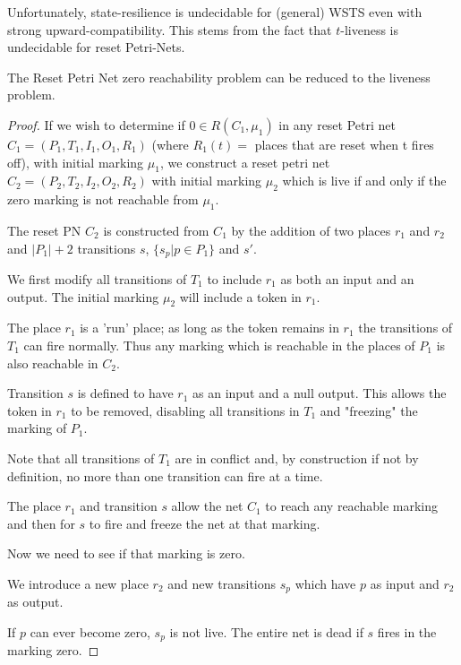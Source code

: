 Unfortunately, state-resilience is undecidable for (general) WSTS even with strong upward-compatibility.
This stems from the fact that $t$-liveness is undecidable for reset Petri-Nets.


\begin{theorem}\label{liveness reset}
The  Reset Petri Net zero reachability problem can be reduced to the liveness problem.
\end{theorem}

\iffalse
\begin{proof}
If we wish to determine if $0 \in R(C_1, \mu_1)$ in any
reset Petri net $C_1 = (P_1, T_1, I_1, O_1, R_1 )$ (where $R_1(t) =$ places that are reset when t fires off), with initial marking $\mu_1$, we construct a
reset petri net $C_2 = (P_2, T_2, I_2, O_2, R_2 )$ with initial marking
$\mu_2$ which is live if and only if the zero marking is not reachable from $\mu_1$.

The reset PN $C_2$ is constructed from $C_1$ by the addition of two places $r_1$ and $r_2$
and $|P_1| +2$ transitions $s$, $\{ s_p | p \in P_1 \}$ and $s'$.

We first modify all transitions of $T_1$ to include $r_1$ as both an input and an output.
The initial marking $\mu_2$ will include a token in $r_1$. 


The place $r_1$ is a 'run' place; as long as the token remains in $r_1$ the transitions of $T_1$ can fire normally.
Thus any marking which is reachable in the places of $P_1$ is also reachable in $C_2$.



Transition $s$ is defined to have $r_1$ as an input and a null output.
This allows the token in $r_1$ to be removed, disabling all transitions in $T_1$
and "freezing" the marking of $P_1$.

Note that all transitions of $T_1$ are in conflict and, by construction if not by definition, no more than one transition can fire at a time.

The place $r_1$ and transition $s$ allow the net $C_1$ to reach any reachable marking and then for $s$ to fire and freeze the net at that marking.

Now we need to see if that marking is zero.

We introduce a new place $r_2$ and new transitions $s_p$ which have $p$ as input and $r_2$ as output.

If $p$ can ever become zero, $s_p$ is not live. The entire net is dead if
$s$ fires in the marking zero.


\end{proof}
